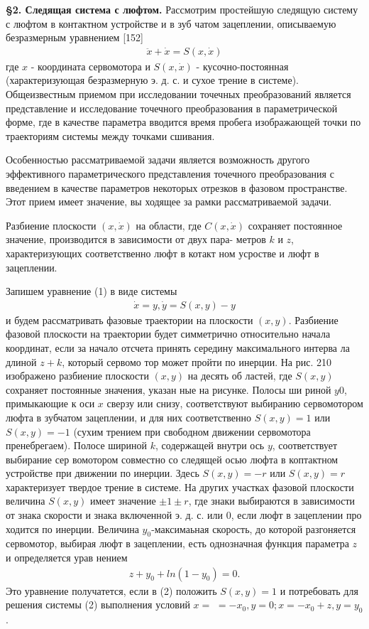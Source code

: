 \documentclass{article}
\begin{document}
\textbf{\S 2. Следящая система с люфтом.} Рассмотрим простейшую
следящую систему с люфтом в контактном устройстве и в зуб
чатом зацеплении, описываемую безразмерным уравнением [152]
\begin{gather}
\ddot{x}+\dot{x}=S(x, \dot{x})
\end{gather}
где $x$ - координата сервомотора и $S(x, \dot{x})$ - кусочно-постоянная
(характеризующая безразмерную э. д. с. и сухое трение в системе). 
Общеизвестным приемом при исследовании точечных преобразований 
является представление и исследование точечного преобразования в 
параметрической форме, где в качестве параметра вводится время пробега 
изображающей точки по траекториям системы между точками сшивания.%

Особенностью рассматриваемой задачи является возможность
другого эффективного параметрического представления точечного
преобразования с введением в качестве параметров некоторых
отрезков в фазовом пространстве. Этот прием имеет значение, вы
ходящее за рамки рассматриваемой задачи.%

Разбиение плоскости $(x, \dot{x})$ на области, где $C(x, \dot{x})$ сохраняет
постоянное значение, производится в зависимости от двух пара-
метров $k$ и $z$, характеризующих соответственно люфт в котакт
ном усростве и люфт в зацеплении.%

Запишем уравнение (1) в виде системы
\begin{gather}
\dot{x}=y, \dot{y}=S(x,y)-y
\end{gather} 
и будем рассматривать фазовые траектории на плоскости $(x, y)$.
Разбиение фазовой плоскости на траектории будет симметрично
относительно начала координат, если за начало отсчета принять
середину максимального интерва
ла длиной $z+k$, который сервомо
тор может пройти по инерции. На
рис. 210 изображено разбиение
плоскости $(x, y)$ на десять об
ластей, где $S(x, y)$ сохраняет
постоянные значения, указан
ные на рисунке. Полосы ши
риной $y0$, примыкающие к оси $x$
сверзу или снизу, соответствуют
выбиранию сервомотором люфта
в зубчатом зацеплении, и для
них соответственно $S(x, y)=1$
или $S(x, y)=-1$ (сухим трением
при свободном движении сервомотора пренебрегаем). Полосе шириной $k$, содержащей внутри ось $y$, соответствует выбирание сер
вомотором совместно со следящей осью люфта в коптактном
устройстве при движении по инерции. Здесь $S(x, y)=-r$ или
$S(x, y)=r$ характеризует твердое трение в системе. На других
участках фазовой плоскости величина $S(x, y)$ имеет значение
$\pm 1 \pm r$, где знаки выбираются в зависимости от знака скорости
и знака включенной э. д. с. или 0, если люфт в зацеплении про
ходится по инерции. Величина $y_{0}$-максимаьная скорость, до
которой разгоняется сервомотор, выбирая люфт в зацеплении,
есть однозначная функция параметра $z$ и определяется урав
нением
\begin{gather}
z+y_{0}+ln(1-y_{0})=0.
\end{gather}
Это уравнение получатется, если в (2) положить $S(x,y)=1$ и
потребовать для решения системы (2) выполнения условий $x=$
$=-x_{0}, y=0; x=-x_{0}+z, y=y_{0}$.%
\end{document}
